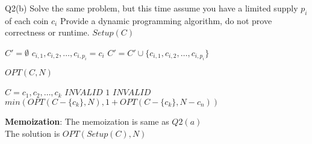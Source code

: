 \begin{problem}
  {Q2(b)}
  Solve the same problem, but this time assume you have a limited supply $p_i$ of each coin $c_i$
  Provide a dynamic programming algorithm, do not prove correctness or runtime.
  $Setup(C)$
  \begin{algorithmic}[1]
      \STATE $C' = \emptyset$
      \STATE $c_{i,1}, c_{i, 2}, \dots, c_{i, p_i} = c_i$
      \STATE $C' = C' \cup \{c_{i, 1}, c_{i, 2}, \dots, c_{i, p_i}\}$
      \ENDFOR
  \end{algorithmic}
  $OPT(C, N)$
  \begin{algorithmic}[1]
      \STATE $C = c_1, c_2, \dots, c_k$
      \RETURN $INVALID$
      \ENDIF
      \RETURN $1$
      \ENDIF
      \RETURN $INVALID$
      \ENDIF
      \RETURN $min(OPT(C - \{c_k\}, N), 1 + OPT(C - \{c_k\}, N-c_n))$
  \end{algorithmic}
  \noindent
  \textbf{Memoization}:
  The memoization is same as $Q2(a)$ \\
  The solution is $OPT(Setup(C), N)$ \\
\end{problem}
